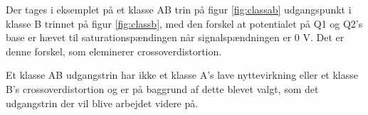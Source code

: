 Der tages i eksemplet på et klasse AB trin på figur \ref{fig:classab} udgangspunkt i klasse B trinnet på figur \ref{fig:classb}, med den forskel at potentialet på Q1 og Q2's base er hævet til saturationspændingen når signalspændningen er 0 V. Det er denne forskel, som eleminerer crossoverdistortion.

Et klasse AB udgangstrin har ikke et klasse A's lave nyttevirkning eller et klasse B's crossoverdistortion og er på baggrund af dette blevet valgt, som det udgangstrin der vil blive arbejdet videre på.